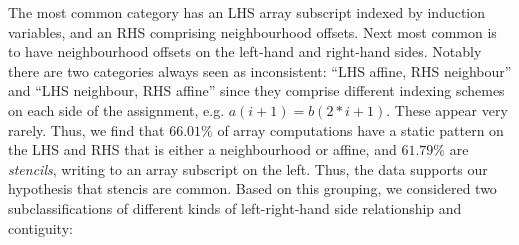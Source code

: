 \begin{center}
\begin{tabular}{ll|S[table-format=4]S[table-format=2.2]S[table-format=4]S[table-format=2.2]c}
\end{tabular}
\end{center}
%
The most common category has an LHS array subscript
indexed by induction variables, and an RHS comprising
neighbourhood offsets. Next most common is to have neighbourhood
offsets on the left-hand and right-hand sides. Notably
there are two categories always seen as inconsistent:
``LHS affine, RHS neighbour'' and ``LHS neighbour, RHS affine''
since they comprise different indexing schemes
on each side of the assignment, e.g. $a(i + 1) = b(2*i + 1)$. These
appear very rarely. Thus, we find that $66.01\%$ of array computations
have a static pattern on the LHS and RHS that is either
a neighbourhood or affine, and $61.79\%$ are \emph{stencils},
writing to an array subscript on the left. Thus, the data supports our
hypothesis that stencis are common. Based on this grouping, we
considered two subclassifications of different kinds of
left-right-hand side relationship and contiguity:
